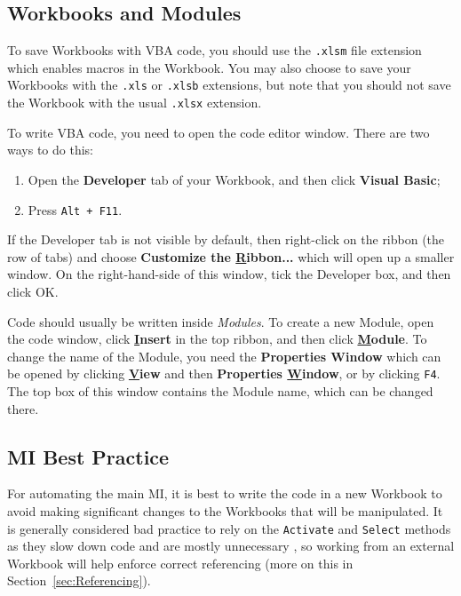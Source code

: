 \documentclass[11pt]{article}%
\begin{document}

\subsection{Workbooks and Modules}

To save Workbooks with VBA code, you should use the \texttt{.xlsm} file extension which enables macros in the Workbook. You may also choose to save your Workbooks with the \texttt{.xls} or \texttt{.xlsb} extensions, but note that you should not save the Workbook with the usual \texttt{.xlsx} extension.

To write VBA code, you need to open the code editor window. There are two ways to do this:

\begin{enumerate}
    \item Open the \textbf{Developer} tab of your Workbook, and then click \textbf{Visual Basic};
    \item Press \texttt{Alt + F11}.
\end{enumerate}

If the Developer tab is not visible by default, then right-click on the ribbon (the row of tabs) and choose \textbf{Customize the \underline{R}ibbon...} which will open up a smaller window. On the right-hand-side of this window, tick the Developer box, and then click OK.

Code should usually be written inside \textit{Modules}. To create a new Module, open the code window, click \textbf{\underline{I}nsert} in the top ribbon, and then click \textbf{\underline{M}odule}. To change the name of the Module, you need the \textbf{Properties Window} which can be opened by clicking \textbf{\underline{V}iew} and then \textbf{Properties \underline{W}indow}, or by clicking \texttt{F4}. The top box of this window contains the Module name, which can be changed there.


\subsection{MI Best Practice}

For automating the main MI, it is best to write the code in a new Workbook to avoid making significant changes to the Workbooks that will be manipulated. It is generally considered bad practice to rely on the \texttt{Activate} and \texttt{Select} methods as they slow down code and are mostly unnecessary \cite{AvoidSelectActivate}, so working from an external Workbook will help enforce correct referencing (more on this in Section~\ref{sec:Referencing}).
\end{document}
